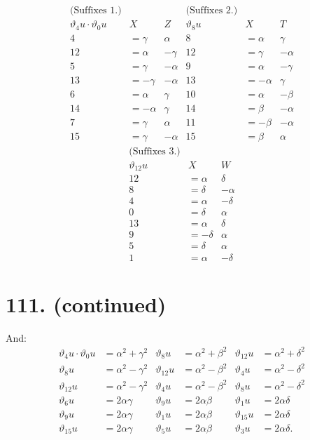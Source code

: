 \documentclass[11pt,a4paper]{article}
\newcommand{\uth}[1]{\vartheta_{#1}}
\begin{document}
\[
\begin{array}{c|cc|c|cc}
\text{(Suffixes 1.)} & & & \text{(Suffixes 2.)} & & \\
\hline
\uth{4}u \cdot \uth{0}u & X & Z & \uth{8}u & X & T \\
\hline
4 & = \gamma & \alpha & 8 & = \alpha & \gamma \\
12 & = \alpha & -\gamma & 12 & = \gamma & -\alpha \\
5 & = \gamma & -\alpha & 9 & = \alpha & -\gamma \\
13 & = -\gamma & -\alpha & 13 & = -\alpha & \gamma \\
6 & = \alpha & \gamma & 10 & = \alpha & -\beta \\
14 & = -\alpha & \gamma & 14 & = \beta & -\alpha \\
7 & = \gamma & \alpha & 11 & = -\beta & -\alpha \\
15 & = \gamma & -\alpha & 15 & = \beta & \alpha
\end{array}
\]
\[
\begin{array}{c|cc}
\text{(Suffixes 3.)} & & \\
\hline
\uth{12}u & X & W \\
\hline
12 & = \alpha & \delta \\
8 & = \delta & -\alpha \\
4 & = \alpha & -\delta \\
0 & = \delta & \alpha \\
13 & = \alpha & \delta \\
9 & = -\delta & \alpha \\
5 & = \delta & \alpha \\
1 & = \alpha & -\delta
\end{array}
\]

\newpage
\section*{111. (continued)}
\label{sec:111cont}

And:
\begin{align*}
\uth{4}u \cdot \uth{0}u &= \alpha^2 + \gamma^2 & \uth{8}u &= \alpha^2 + \beta^2 & \uth{12}u &= \alpha^2 + \delta^2 \\
\uth{8}u &= \alpha^2 - \gamma^2 & \uth{12}u &= \alpha^2 - \beta^2 & \uth{4}u &= \alpha^2 - \delta^2 \\
\uth{12}u &= \alpha^2 - \gamma^2 & \uth{4}u &= \alpha^2 - \beta^2 & \uth{8}u &= \alpha^2 - \delta^2 \\
\uth{6}u &= 2\alpha\gamma & \uth{9}u &= 2\alpha\beta & \uth{1}u &= 2\alpha\delta \\
\uth{9}u &= 2\alpha\gamma & \uth{1}u &= 2\alpha\beta & \uth{15}u &= 2\alpha\delta \\
\uth{15}u &= 2\alpha\gamma & \uth{5}u &= 2\alpha\beta & \uth{3}u &= 2\alpha\delta.
\end{align*}
\end{document}
